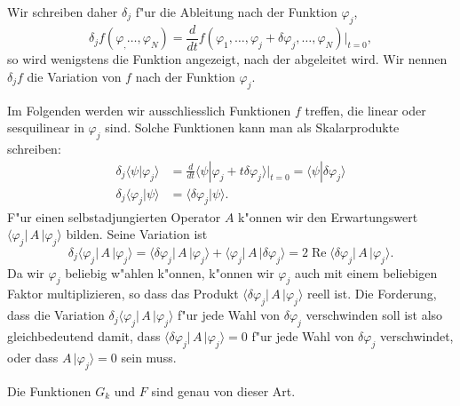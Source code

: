 Wir schreiben daher $\delta_j$ f"ur die Ableitung nach der Funktion $\varphi_j$,
\[
\delta_j f(\varphi_,\dots,\varphi_N)
=
\frac{d}{dt}f(\varphi_1,\dots,\varphi_j+\delta\varphi_j,\dots,\varphi_N)\bigg|_{t=0},
\]
so wird wenigstens die Funktion angezeigt, nach der abgeleitet wird.
Wir nennen $\delta_j f$ die Variation von $f$ nach der Funktion $\varphi_j$.

Im Folgenden werden wir ausschliesslich Funktionen $f$ treffen, die 
linear oder sesquilinear in $\varphi_j$ sind. Solche Funktionen
kann man als Skalarprodukte schreiben:
\begin{align*}
\delta_j\langle\psi|\varphi_j\rangle
&=
\frac{d}{dt}
\langle\psi|\varphi_j+t\delta\varphi_j\rangle\bigg|_{t=0}
=
\langle\psi|\delta\varphi_j\rangle
\\
\delta_j\langle\varphi_j|\psi\rangle
&=
\langle\delta\varphi_j|\psi\rangle.
\end{align*}
F"ur einen selbstadjungierten Operator $A$ k"onnen wir den Erwartungswert
$\langle\varphi_j|\,A\,|\varphi_j\rangle$ bilden.
Seine Variation ist
\[
\delta_j\langle\varphi_j|\,A\,|\varphi_j\rangle
=
\langle\delta\varphi_j|\,A\,|\varphi_j\rangle
+
\langle\varphi_j|\,A\,|\delta\varphi_j\rangle
=
2\operatorname{Re}\langle\delta\varphi_j|\,A\,|\varphi_j\rangle.
\]
Da wir $\varphi_j$ beliebig w"ahlen k"onnen, k"onnen wir $\varphi_j$
auch mit einem beliebigen Faktor multiplizieren, so dass das
Produkt $\langle\delta\varphi_j|\,A\,|\varphi_j\rangle$ reell ist.
Die Forderung, dass die Variation
$\delta_j\langle\varphi_j|\,A\,|\varphi_j\rangle$
f"ur jede Wahl von $\delta\varphi_j$
verschwinden soll ist also gleichbedeutend damit, dass
$\langle\delta\varphi_j|\,A\,|\varphi_j\rangle=0$
f"ur jede Wahl von $\delta\varphi_j$ verschwindet, oder dass
$A\,|\varphi_j\rangle=0$ sein muss.

Die Funktionen $G_k$ und $F$ sind genau von dieser Art.

